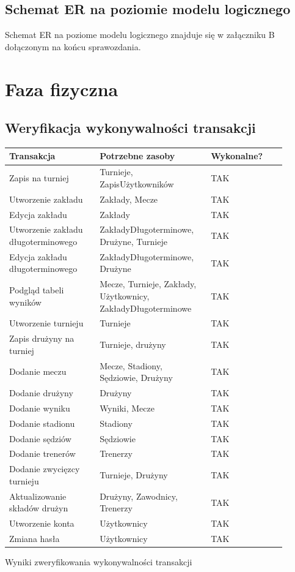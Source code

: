 \documentclass{mwrep}
\begin{document}
\section{Schemat ER na poziomie modelu logicznego}
Schemat ER na poziome modelu logicznego znajduje się w załączniku B dołączonym na końcu sprawozdania.

\chapter{Faza fizyczna}

\section{Weryfikacja wykonywalności transakcji}

\vspace{1cm}
\begin{threeparttable}[H]
	\begin{tabular}{|p{0.3\linewidth}|p{0.35\linewidth}|p{0.25\linewidth}|}
	\hline
	Transakcja & Potrzebne zasoby & Wykonalne? \\ \hline
	Zapis na turniej & Turnieje, ZapisUżytkowników & TAK \\ \hline
	Utworzenie zakładu & Zakłady, Mecze & TAK \\ \hline
	Edycja zakładu & Zakłady & TAK \\ \hline
	Utworzenie zakładu długoterminowego & ZakładyDługoterminowe, Drużyne, Turnieje & TAK \\ \hline
	Edycja zakładu długoterminowego & ZakładyDługoterminowe, Drużyne & TAK \\ \hline
	Podgląd tabeli wyników  & Mecze, Turnieje, Zakłady, Użytkownicy, ZakładyDługoterminowe & TAK \\ \hline
	Utworzenie turnieju & Turnieje & TAK \\ \hline
	Zapis drużyny na turniej & Turnieje, drużyny & TAK \\ \hline
	Dodanie meczu & Mecze, Stadiony, Sędziowie, Drużyny & TAK \\ \hline
	Dodanie drużyny & Drużyny & TAK \\ \hline
	Dodanie wyniku & Wyniki, Mecze & TAK \\ \hline
	Dodanie stadionu & Stadiony & TAK \\ \hline
	Dodanie sędziów & Sędziowie & TAK \\ \hline
	Dodanie trenerów & Trenerzy & TAK \\ \hline
	Dodanie zwycięzcy turnieju & Turnieje, Drużyny & TAK \\ \hline
	Aktualizowanie składów drużyn & Drużyny, Zawodnicy, Trenerzy & TAK \\ \hline
	Utworzenie konta & Użytkownicy & TAK \\ \hline
	Zmiana hasła & Użytkownicy & TAK \\ \hline
	\end{tabular}	
	\caption{Wyniki zweryfikowania wykonywalności transakcji}
\end{threeparttable}
\vspace{1cm}
\end{document}
